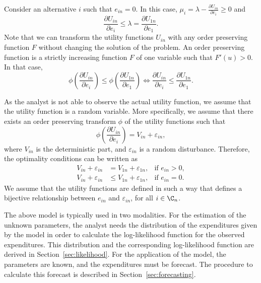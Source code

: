 \documentclass[12pt,a4paper]{article}
\begin{document}
Consider an alternative $i$ such that $e_{in} = 0$. In this case, $\mu_i=  \lambda- \frac{\partial U_{in}}{\partial e_i} \geq 0$ and
\begin{equation}
\label{eq:unchosen}
\frac{\partial U_{in}}{\partial e_i}  \leq \lambda = \frac{\partial U_{1n}}{\partial e_1}.
\end{equation}
Note that we can transform the utility functions $U_{in}$ with any order preserving function $F$ without changing the solution of the problem. An order preserving function is a strictly increasing function $F$ of one variable such that $F'(u) > 0$. In that case,
\begin{equation}
\label{eq:phi_transform}
\phi\left(\frac{\partial U_{in}}{\partial e_i}\right) \leq \phi\left(\frac{\partial U_{1n}}{\partial e_1}\right) \Longleftrightarrow
\frac{\partial U_{in}}{\partial e_i}  \leq \frac{\partial U_{1n}}{\partial e_1}.
\end{equation}

As the analyst is not able to observe the actual utility function, we  assume that the utility function is a random variable.
More specifically, we assume that there exists an order preserving transform $\phi$ of the utility functions such that
\begin{equation}
\label{eq:utility_def}
\phi\left(\frac{\partial U_{in}}{\partial e_i}\right) = V_{in} + \varepsilon_{in},
\end{equation}
where $V_{in}$ is the deterministic part, and $\varepsilon_{in}$ is a random disturbance. Therefore, the optimality conditions can be written as
\begin{align}
V_{in} + \varepsilon_{in}  &= V_{1n} + \varepsilon_{1n},  & \text{if } e_{in} > 0, \label{eq:non_zero}\\
V_{in} + \varepsilon_{in}  &\leq V_{1n} + \varepsilon_{1n},  & \text{if } e_{in} = 0. \label{eq:zero}
\end{align}
We assume that the utility functions are defined in such a way that
 defines a bijective relationship between $e_{in}$ and
$\varepsilon_{in}$, for all $i\in\C_n$.

The above model is typically used in two modalities. For the estimation of the unknown parameters, the analyst needs
the distribution of the expenditures given by the model in order to calculate the log-likelihood function
for the observed expenditures. This distribution and the corresponding log-likelihood function are derived in
Section~\ref{sec:likelihood}. For the application of the model, the parameters are known, and the expenditures must
be forecast. The procedure to calculate this forecast is described in Section~\ref{sec:forecasting}.
\end{document}
